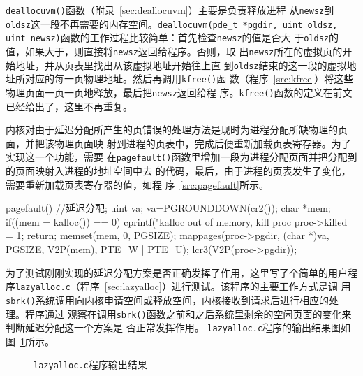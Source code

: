 \documentclass{swfcthesismscctex}
\begin{document}
\texttt{deallocuvm()}函数（附录~\ref{sec:deallocuvm}）主要是负责释放进程
从\texttt{newsz}到\texttt{oldsz}这一段不再需要的内存空间。\texttt{deallocuvm(pde\_t
  *pgdir, uint oldsz, uint newsz)}函数的工作过程比较简单：首先检查\texttt{newsz}的值是否大
于\texttt{oldsz}的值，如果大于，则直接将\texttt{newsz}返回给程序。否则，取
出\texttt{newsz}所在的虚拟页的开始地址，并从页表里找出从该虚拟地址开始往上直
到\texttt{oldsz}结束的这一段的虚拟地址所对应的每一页物理地址。然后再调用\texttt{kfree()}函
数（程序~\ref{src:kfree}）将这些物理页面一页一页地释放，最后把\texttt{newsz}返回给程
序。\texttt{kfree()}函数的定义在前文已经给出了，这里不再重复。

内核对由于延迟分配所产生的页错误的处理方法是现时为进程分配所缺物理的页面，并把该物理页面映
射到进程的页表中，完成后便重新加载页表寄存器。为了实现这一个功能，需要
在\texttt{pagefault()}函数里增加一段为进程分配页面并把分配到的页面映射入进程的地址空间中去
的代码，最后，由于进程的页表发生了变化，需要重新加载页表寄存器的值，如程
序~\ref{src:pagefault}所示。 

\begin{listing}
  \begin{codeblock}
\begin{ccode}
pagefault()
 {//延迟分配;
   uint va;
   va=PGROUNDDOWN(cr2());
   char *mem;
   if((mem = kalloc()) == 0) {
     cprintf("kalloc out of memory, kill proc %
     proc->killed = 1;
     return;
   }
   memset(mem, 0, PGSIZE);
   mappages(proc->pgdir, (char *)va, PGSIZE, V2P(mem), PTE_W | PTE_U);
   lcr3(V2P(proc->pgdir));
  }
\end{ccode}
  \end{codeblock}
  \label{src:pagefault}
\end{listing}
 
为了测试刚刚实现的延迟分配方案是否正确发挥了作用，这里写了个简单的用户程
序\texttt{lazyalloc.c}（程序~\ref{sec:lazyalloc}）进行测试。该程序的主要工作方式是调
用\texttt{sbrk()}系统调用向内核申请空间或释放空间，内核接收到请求后进行相应的处理。程序通过
观察在调用\texttt{sbrk()}函数之前和之后系统里剩余的空闲页面的变化来判断延迟分配这一个方案是
否正常发挥作用。 \texttt{lazyalloc.c}程序的输出结果图如图~\ref{fig:lazyalloc}所示。
 
\begin{figure}
  \centering {}
  \caption{\texttt{lazyalloc.c}程序输出结果}\label{fig:lazyalloc}
\end{figure}
\end{document}
